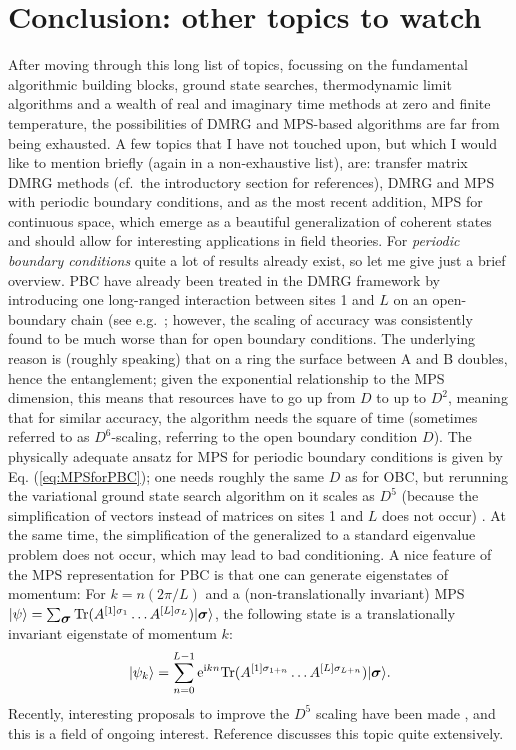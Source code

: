\documentclass[a4paper,10pt,oneside,onecolumn,1p,times]{elsarticle}
\newcommand{\tr}{{\rm Tr }}
\newcommand{\eul}{{\rm e }}
\newcommand{\imag}{{\rm i }}
\newcommand{\ket}[1]{\mbox{$| #1  \rangle$}}
\newcommand{\fat}[1]{\mbox{\boldmath$#1$\unboldmath}}	%
\begin{document}
\section{Conclusion: other topics to watch}
After moving through this long list of topics, focussing on the fundamental algorithmic building blocks, ground state searches, thermodynamic limit algorithms and a wealth of real and imaginary time methods at zero and finite temperature, the possibilities of DMRG and MPS-based algorithms are far from being exhausted. A few topics that I have not touched upon, but which I would like to mention briefly (again in a non-exhaustive list), are: transfer matrix DMRG methods (cf.\ the introductory section for references), DMRG and MPS with periodic boundary conditions, and as the most recent addition, MPS for continuous space\cite{Verstraete10}, which emerge as a beautiful generalization of coherent states and should allow for interesting applications in field theories. For {\em periodic boundary conditions} quite a lot of results already exist, so let me give just a brief overview. PBC have already been treated in the DMRG framework by introducing one long-ranged interaction between sites 1 and $L$ on an open-boundary chain (see e.g.\ \cite{Schmitteckert96,Rapsch99,Meden03a,Meden03b}; however, the scaling of accuracy was consistently found to be much worse than for open boundary conditions. The underlying reason is (roughly speaking) that on a ring the surface between A and B doubles, hence the entanglement; given the exponential relationship to the MPS dimension, this means that resources have to go up from $D$ to up to $D^2$, meaning that for similar accuracy, the algorithm needs the square of time (sometimes referred to as $D^6$-scaling, referring to the open boundary condition $D$). The physically adequate ansatz for MPS for periodic boundary conditions is given by Eq. (\ref{eq:MPSforPBC}); one needs roughly the same $D$ as for OBC, but rerunning the variational ground state search algorithm on it scales as $D^5$ (because the simplification of vectors instead of matrices on sites 1 and $L$ does not occur) \cite{VerstraetePorras04}. At the same time, the simplification of the generalized to a standard eigenvalue problem does not occur, which may lead to bad conditioning. A nice feature of the MPS representation for PBC is that one can generate eigenstates of momentum: For $k = n (2\pi/L)$ and a (non-translationally invariant) MPS $\ket{\psi} = \sum_{{\fat{\sigma}}} \tr (A^{[1]\sigma_1} \ldots A^{[L]\sigma_L}) \ket{\fat{\sigma}}$, the following state is a translationally invariant eigenstate of momentum $k$: \cite{Porras06}
\begin{equation}
\ket{\psi_k} = \sum_{n=0}^{L-1} \eul^{\imag k n}  \tr (A^{[1]\sigma_{1+n}} \ldots A^{[L]\sigma_{L+n}}) \ket{\fat{\sigma}} .
\end{equation}
Recently, interesting proposals to improve the $D^5$ scaling have been made \cite{Pippan10,Pirvu10}, and this is a field of ongoing interest. Reference \cite{VerstraeteMurg08} discusses this topic quite extensively.
\end{document}

